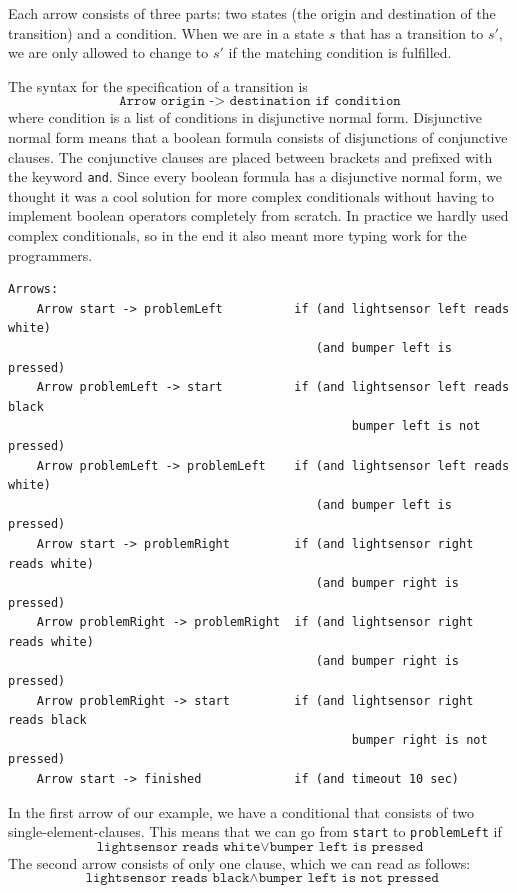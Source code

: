 \documentclass[11pt,a4paper]{article}
\begin{document}
Each arrow consists of three parts: two states (the origin and destination of the transition) and a condition. When we are in a state $s$ that has a transition to $s'$, we are only allowed to change to $s'$ if the matching condition is fulfilled. 

The syntax for the specification of a transition is
\[ \texttt{Arrow origin -> destination	if condition} \]
where condition is a list of conditions in disjunctive normal form. 
Disjunctive normal form means that a boolean formula consists of disjunctions of conjunctive clauses. The conjunctive clauses are placed between brackets and prefixed with the keyword \texttt{and}.
Since every boolean formula has a disjunctive normal form, we thought it was a cool solution for more complex conditionals without having to implement boolean operators completely from scratch. In practice we hardly used complex conditionals, so in the end it also meant more typing work for the programmers.

\begin{verbatim}
Arrows: 
    Arrow start -> problemLeft          if (and lightsensor left reads white) 
                                           (and bumper left is pressed)
    Arrow problemLeft -> start          if (and lightsensor left reads black 
                                                bumper left is not pressed)
    Arrow problemLeft -> problemLeft    if (and lightsensor left reads white) 
                                           (and bumper left is pressed)
    Arrow start -> problemRight         if (and lightsensor right reads white) 
                                           (and bumper right is pressed)
    Arrow problemRight -> problemRight  if (and lightsensor right reads white) 
                                           (and bumper right is pressed)
    Arrow problemRight -> start         if (and lightsensor right reads black 
                                                bumper right is not pressed)
    Arrow start -> finished             if (and timeout 10 sec)

\end{verbatim}

In the first arrow of our example, we have a conditional that consists of two single-element-clauses. This means that we can go from \texttt{start} to \texttt{problemLeft} if
\[ \texttt{lightsensor reads white} \vee \texttt{bumper left is pressed} \]
The second arrow consists of only one clause, which we can read as follows:
\[ \texttt{ lightsensor reads black} \wedge \texttt{bumper left is not pressed} \]
\end{document}
